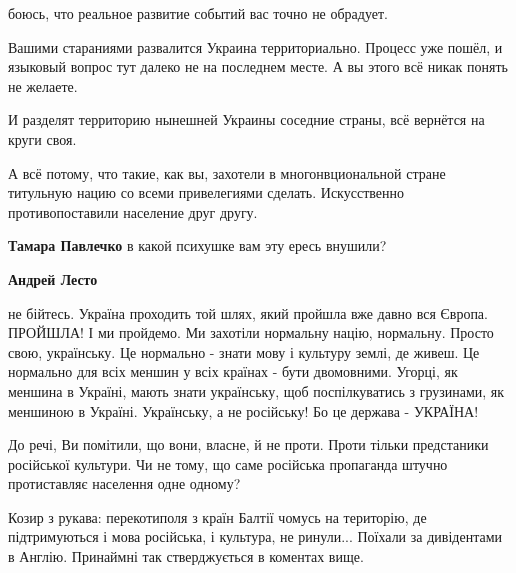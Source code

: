 \begin{itemize}
\begin{itemize}
боюсь, что реальное развитие событий вас точно не обрадует.

Вашими стараниями развалится Украина территориально. Процесс уже пошёл, и
языковый вопрос тут далеко не на последнем месте. А вы этого всё никак понять
не желаете.

И разделят территорию нынешней Украины соседние страны, всё вернётся на круги
своя.

А всё потому, что такие, как вы, захотели в многонвциональной стране титульную
нацию со всеми привелегиями сделать. Искусственно противопоставили население
друг другу.

 
\textbf{Тамара Павлечко} в какой психушке вам эту ересь внушили?

 
\textbf{Андрей Лесто} 

не бійтесь. Україна проходить той шлях, який пройшла вже давно вся Європа.
ПРОЙШЛА! І ми пройдемо. Ми захотіли нормальну націю, нормальну. Просто свою,
українську. Це нормально - знати мову і культуру землі, де живеш. Це нормально
для всіх меншин у всіх країнах - бути двомовними. Угорці, як меншина в Україні,
мають знати українську, щоб поспілкуватись з грузинами, як меншиною в Україні.
Українську, а не російську! Бо це держава - УКРАЇНА! 

До речі, Ви помітили, що вони, власне, й не проти. Проти тільки предстаники
російської культури. Чи не тому, що саме російська пропаганда штучно
протиставляє населення одне одному?

Козир з рукава: перекотиполя з країн Балтії чомусь на територію, де
підтримуються і мова російська, і культура, не ринули... Поїхали за дивідентами
в Англію. Принаймні так стверджується в коментах вище.

 

\end{itemize}
\end{itemize}
